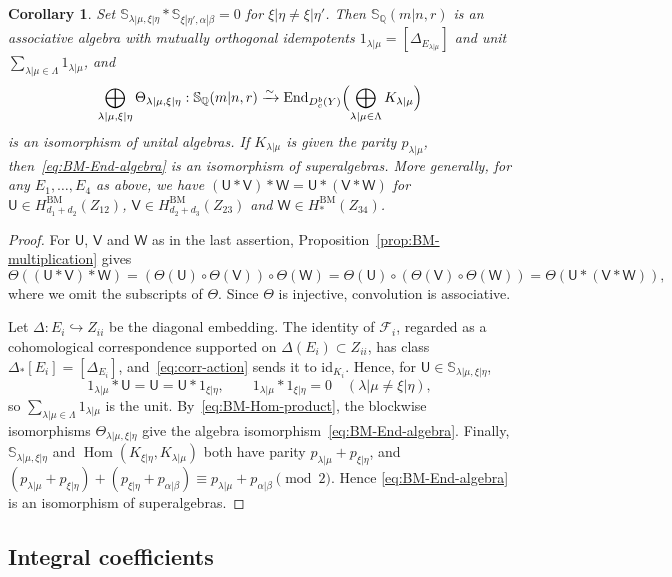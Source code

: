 \documentclass[11pt,a4paper]{amsart}
\newtheorem{corollary}[theorem]{Corollary}
\theoremstyle{definition}
\theoremstyle{remark}
\newcommand{\Q}{\mathbb Q}
\newcommand{\bS}{\mathbb S}
\newcommand{\BM}{\mathrm{BM}}
\newcommand{\End}{\operatorname{End}}
\newcommand{\Hom}{\operatorname{Hom}}
\newcommand{\lm}{\lambda|\mu}
\newcommand{\xh}{\xi|\eta}
\newcommand{\ab}{\alpha|\beta}
\numberwithin{equation}{section}
\begin{document}
\begin{corollary}\label{cor:BM-associative}
Set $\bS_{\lm,\xh}*\bS_{\xh',\ab}=0$ for $\xh\ne\xh'$. Then
$\bS_\Q(m|n,r)$ is an associative algebra with mutually orthogonal
idempotents $1_{\lm}=[\Delta_{E_{\lm}}]$ and unit
$\sum_{\lm\in\Lambda}1_{\lm}$, and
\begin{equation}\label{eq:BM-End-algebra}
\bigoplus_{\lm,\xh}\Theta_{\lm,\xh}:\bS_\Q(m|n,r)
\xrightarrow{\sim}\End_{D_c^b(Y)}
 \Bigl(\bigoplus_{\lm\in\Lambda}K_{\lm}\Bigr)
\end{equation}
is an isomorphism of unital algebras. If $K_{\lm}$ is given the
parity $p_{\lm}$, then~\eqref{eq:BM-End-algebra} is an isomorphism of
superalgebras. More generally, for any $E_1,\ldots,E_4$ as above, we
have $(\mathsf U*\mathsf V)*\mathsf W=\mathsf U*(\mathsf V*\mathsf W)$
for $\mathsf U\in H^{\BM}_{d_1+d_2}(Z_{12})$,
$\mathsf V\in H^{\BM}_{d_2+d_3}(Z_{23})$ and
$\mathsf W\in H^{\BM}_*(Z_{34})$.
\end{corollary}
\begin{proof}
For $\mathsf U$, $\mathsf V$ and $\mathsf W$ as in the last assertion,
Proposition~\ref{prop:BM-multiplication} gives
$$
\Theta((\mathsf U*\mathsf V)*\mathsf W)
=(\Theta(\mathsf U)\circ\Theta(\mathsf V))\circ\Theta(\mathsf W)
=\Theta(\mathsf U)\circ(\Theta(\mathsf V)\circ\Theta(\mathsf W))
=\Theta(\mathsf U*(\mathsf V*\mathsf W)),
$$
where we omit the subscripts of $\Theta$. Since $\Theta$ is injective,
convolution is associative.

Let $\Delta:E_i\hookrightarrow Z_{ii}$ be the diagonal embedding. The
identity of $\mathcal F_i$, regarded as a cohomological correspondence
supported on $\Delta(E_i)\subset Z_{ii}$, has class
$\Delta_*[E_i]=[\Delta_{E_i}]$, and~\eqref{eq:corr-action} sends it to
$\mathrm{id}_{K_i}$. Hence, for $\mathsf U\in\bS_{\lm,\xh}$,
$$
1_{\lm}*\mathsf U=\mathsf U=\mathsf U*1_{\xh},\qquad
1_{\lm}*1_{\xh}=0\quad(\lm\ne\xh),
$$
so $\sum_{\lm\in\Lambda}1_{\lm}$ is the unit. By~\eqref{eq:BM-Hom-product},
the blockwise isomorphisms $\Theta_{\lm,\xh}$ give the algebra
isomorphism~\eqref{eq:BM-End-algebra}. Finally, $\bS_{\lm,\xh}$ and
$\Hom(K_{\xh},K_{\lm})$ both have parity $p_{\lm}+p_{\xh}$, and
$(p_{\lm}+p_{\xh})+(p_{\xh}+p_{\ab})\equiv p_{\lm}+p_{\ab}\pmod2$. Hence
\eqref{eq:BM-End-algebra} is an isomorphism of superalgebras.
\end{proof}

\subsection{Integral coefficients}
\label{sec:integral-nonclosure}
\end{document}
